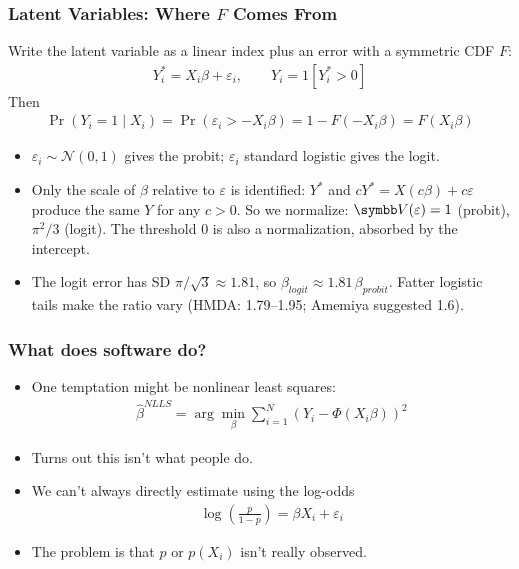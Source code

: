 \documentclass[aspectratio=169,11pt]{beamer}
\begin{document}
\begin{frame}
\frametitle{Latent Variables: Where $F$ Comes From}
\small
Write the latent variable as a linear index plus an error with a symmetric CDF $F$:
\begin{align*}
Y_i^{*} = X_i\beta + \varepsilon_i, \qquad Y_i = 1\left[Y_i^{*} > 0\right]
\end{align*}
Then
\begin{align*}
\Pr(Y_i = 1 \mid X_i) = \Pr(\varepsilon_i > -X_i\beta) = 1 - F(-X_i\beta) = F(X_i\beta)
\end{align*}
\begin{itemize}
\item $\varepsilon_i \sim \mathcal{N}(0,1)$ gives the \alert{probit}; $\varepsilon_i$ standard logistic gives the \alert{logit}.
\item \alert{Only the scale of $\beta$ relative to $\varepsilon$ is identified}: $Y^{*}$ and $cY^{*} = X(c\beta) + c\varepsilon$
produce the same $Y$ for any $c>0$. So we normalize: $\Var(\varepsilon)=1$ (probit), $\pi^2/3$ (logit).
The threshold $0$ is also a normalization, absorbed by the intercept.
\item The logit error has SD $\pi/\sqrt{3} \approx 1.81$, so $\beta_{logit} \approx 1.81\,\beta_{probit}$.
Fatter logistic tails make the ratio vary (HMDA: 1.79--1.95; Amemiya suggested 1.6).
\end{itemize}
\end{frame}




\begin{frame}
\frametitle{What does software do?}
\begin{itemize}
\item One temptation might be \alert{nonlinear least squares}:
\begin{align*}
\hat{\beta}^{NLLS} = \arg \min_{\beta} \sum_{i=1}^N (Y_i - \Phi(X_i \beta))^2
\end{align*}
\item Turns out this isn't what people do.
\item We can't always directly estimate using the log-odds
\begin{align*}
\log\left(\frac{p}{1-p}\right)= \beta X_i + \varepsilon_i
\end{align*}
\item The problem is that $p$ or $p(X_i)$ isn't really observed.
\end{itemize}
\end{frame}
\end{document}
